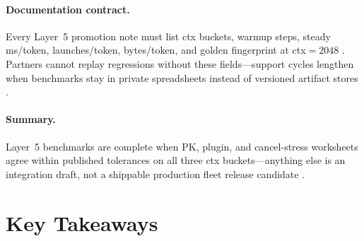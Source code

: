 \paragraph{Documentation contract.} Every Layer~5 promotion note must list ctx buckets, warmup steps, steady ms/token, launches/token, bytes/token, and golden fingerprint at ctx${=}2048$ \citep{yirage2026,chen2020compilerbasedhardw,patel2025llminference,taxbreak2026,memoryfloor2026,kwon2023vllm,liu2024deepseekv3,nvidia2024cudagraphs,dao2022flashattention,amd2024xdna,amd2024aie,dao2023flashdecoding,nvidia2022hopper,semianalysis2024tma,dlbook}. Partners cannot replay regressions without these fields---support cycles lengthen when benchmarks stay in private spreadsheets instead of versioned artifact stores \citep{patel2025llminference,yirage2026,chen2020compilerbasedhardw,kwon2023vllm,memoryfloor2026,taxbreak2026,liu2024deepseekv3,nvidia2024cudagraphs,dao2022flashattention,amd2024aie,amd2024xdna,dao2023flashdecoding,nvidia2022hopper,semianalysis2024tma,dlbook}.


\paragraph{Summary.} Layer~5 benchmarks are complete when PK, plugin, and cancel-stress worksheets agree within published tolerances on all three ctx buckets---anything else is an integration draft, not a shippable production fleet release candidate \citep{yirage2026,chen2020compilerbasedhardw,patel2025llminference,taxbreak2026,memoryfloor2026,kwon2023vllm,liu2024deepseekv3,nvidia2024cudagraphs,dao2022flashattention,amd2024xdna,amd2024aie,dao2023flashdecoding,nvidia2022hopper,semianalysis2024tma,dlbook}.

\section{Key Takeaways}
\label{sec:ch29_key_takeaways}

